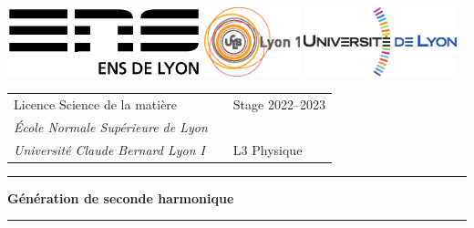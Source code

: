 \documentclass[11pt,a4paper] { article}
\begin{document}
\setlength{\parindent}{0pt}

\hypersetup{pageanchor=false}
\thispagestyle{empty}

\begin{@empty}

\includegraphics[height=2cm]{logoens.eps} \hfill \includegraphics[height=2cm]{logoucbl.eps} \hfill \includegraphics[height=2cm]{logounivlyon.eps}

\vspace{0.5cm}

\begin{tabularx}{\textwidth}{@{} l X l @{} }
{\sc Licence Science de la matière} 	&	& Stage 2022--2023 \\
{\it \'Ecole Normale Sup\'erieure de Lyon}		&	&  \\
{\it Universit\'e Claude Bernard Lyon I}		& 	& L3 Physique
\end{tabularx}

\begin{center}

\vspace{1.5cm}

\rule[11pt]{5cm}{0.5pt}

\textbf{\huge Génération de seconde harmonique}

\rule{5cm}{0.5pt}

\vspace{1.5cm}


\end{center}
\end{@empty}
\end{document}

